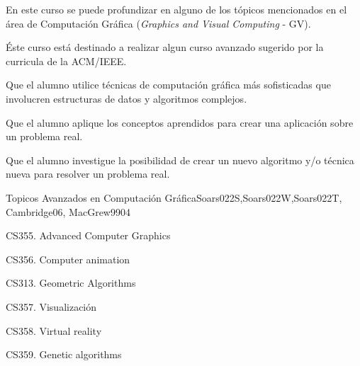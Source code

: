 \begin{syllabus}


\begin{justification}
En este curso se puede profundizar en alguno de los tópicos
mencionados en el área de Computación Gráfica (\textit{Graphics and Visual
Computing} - GV).

Éste curso está destinado a realizar algun curso avanzado sugerido por la curricula de la ACM/IEEE. \cite{Foley13,Hearn90}
\end{justification}

\begin{goals}
\item Que el alumno utilice técnicas de computación gráfica más sofisticadas que involucren estructuras de datos y algoritmos complejos.
\item Que el alumno aplique los conceptos aprendidos para crear una aplicación sobre un problema real.
\item Que el alumno investigue la posibilidad de crear un nuevo algoritmo y/o técnica nueva para resolver un problema real.
\end{goals}

\begin{outcomes}
    \item {}
    \item {}
    \item {}
    \item {}
\end{outcomes}

\begin{competences}
    \item {}
    \item {}
\end{competences}

\begin{unit}{Topicos Avanzados en Computación Gráfica}{}{Soars022S,Soars022W,Soars022T, Cambridge06, MacGrew99}{0}{4}
   \begin{topics}
      \item CS355. Advanced Computer Graphics
      \item CS356. Computer animation
      \item CS313. Geometric Algorithms
      \item CS357. Visualización
      \item CS358. Virtual reality
      \item CS359. Genetic algorithms
   \end{topics}


\end{unit}
\end{syllabus}
